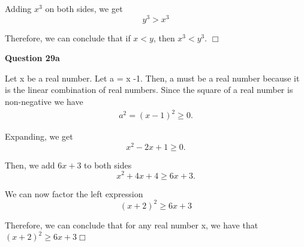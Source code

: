 \documentclass[12pt]{article}
\begin{document}
Adding $x^3$ on both sides, we get
\[
    y^3 > x^3
\]

Therefore, we can conclude that if $x< y$, then $x^3 < y^3$. $\Box{}$

\vspace{50pt}

\noindent \textbf{Question 29a}

Let x be a real number. Let a = x -1.
Then, a must be a real number because it is the linear combination of real numbers.
Since the square of a real number is non-negative we have
\begin{align*}
    a^2 = (x-1)^2 \geq{0}.
\end{align*}

Expanding, we get
\[
    x^2-2x+1 \geq{0}.
\]

Then, we add $6x+3$ to both sides
\[
    x^2+4x+4 \geq{6x+3}.
\]

We can now factor the left expression
\[
    (x+2)^2\geq{6x+3}
\]

Therefore, we can conclude that for any real number x, we have that $(x+2)^2\geq{6x+3} \Box{}$
\end{document}
